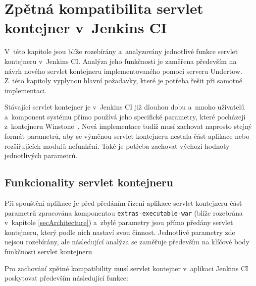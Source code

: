  


    \section{Zpětná kompatibilita servlet kontejner v~Jenkins CI}   \label{secKompatibilita}
        V~této kapitole jsou blíže rozebírány a~analyzovány jednotlivé funkce servlet
        kontejneru v~Jenkins CI. Analýza jeho funkčnosti je zaměřena především na 
        návrh nového servlet kontejneru implementovaného pomocí serveru Undertow.
        Z~této kapitoly vyplynou hlavní požadavky, které je potřeba řešit 
        při samotné implementaci.

        Stávající servlet kontejner je v~Jenkins CI již dlouhou dobu
        a~mnoho uživatelů a~komponent systému přímo používá jeho specifické
        parametry, které pocházejí z~kontejneru Winstone~\cite{kohsukeTopic}. Nová implementace
        tudíž musí zachovat naprosto stejný formát parametrů, aby 
        se výměnou servlet kontejneru nestala část aplikace nebo rozšiřujících modulů nefunkční.
        Také je potřeba zachovat výchozí hodnoty jednotlivých parametrů.

        \subsection{Funkcionality servlet kontejneru}
            Při spouštění aplikace je před předáním řízení aplikace servlet kontejneru
            část parametrů zpracována komponentou \texttt{extras-executable-war} (blíže 
            rozebrána v~kapitole \ref{secArchitecture}) a~zbylé parametry jsou přímo
            předány servlet kontejneru, který podle nich nastaví svou činnost.
            Jednotlivé parametry zde nejsou rozebírány, ale následující analýza
            se zaměřuje především na klíčové body funkčnosti servlet kontejneru.

            Pro zachování zpětné kompatibility musí servlet kontejner v~aplikaci 
            Jenkins CI poskytovat především následující funkce:
            
